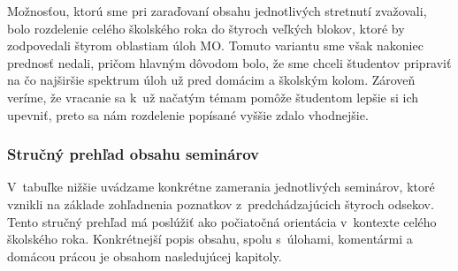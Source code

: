 Možnosťou, ktorú sme pri zaraďovaní obsahu jednotlivých stretnutí zvažovali, bolo rozdelenie celého školského roka do štyroch veľkých blokov, ktoré by zodpovedali  štyrom oblastiam úloh MO. Tomuto variantu sme však nakoniec prednosť nedali, pričom hlavným dôvodom bolo, že sme chceli študentov pripraviť na čo najširšie spektrum úloh už pred domácim a školským kolom. Zároveň veríme, že vracanie sa k~už načatým témam pomôže študentom lepšie si ich upevniť, preto sa nám rozdelenie popísané vyššie zdalo vhodnejšie.

\subsubsection*{Stručný prehľad obsahu seminárov}

V~tabuľke nižšie uvádzame konkrétne zamerania jednotlivých seminárov, ktoré vznikli na základe zohľadnenia poznatkov z~predchádzajúcich štyroch odsekov. Tento stručný prehľad má poslúžiť ako počiatočná orientácia v~kontexte celého školského roka. Konkrétnejší popis obsahu, spolu s~úlohami, komentármi a domácou prácou je obsahom nasledujúcej kapitoly.


